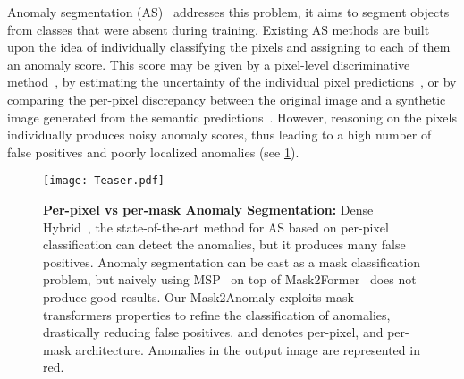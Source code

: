 \documentclass[10pt,twocolumn,letterpaper]{article}
\begin{document}
Anomaly segmentation (AS)~\cite{blum2019fishyscapes,xia2020synth,fontanel2021detecting,jung2021standardized} addresses this problem, \ie it aims to segment objects from classes that were absent during training. Existing AS methods are built upon the idea of individually classifying the pixels and assigning to each of them an anomaly score. This score may be given by a pixel-level discriminative method~\cite{angus2019oodsem, jung2021standardized, grcic2022densehybrid, tian2022pixel}, by estimating the uncertainty of the individual pixel predictions~\cite{mukhoti2018evaluating}, or by comparing the per-pixel discrepancy between the original image and a synthetic image generated from the semantic predictions~\cite{lis2019detecting, vojir2021road, xia2020synthesize}.
However, reasoning on the pixels individually produces noisy anomaly scores, thus leading to a high number of false positives and poorly localized anomalies (see \cref{fig:teaser}).


\begin{figure}[t]
    \begin{center}
        \texttt{[image: Teaser.pdf]}
    \end{center}
    \vspace{-1em}
      \caption{\textbf{Per-pixel vs per-mask Anomaly Segmentation:} Dense Hybrid~\cite{grcic2022densehybrid}, the state-of-the-art method for AS based on per-pixel classification can detect the anomalies, but it produces many false positives. Anomaly segmentation can be cast as a mask classification problem, but naively using MSP~\cite{hendrycks2016baseline} on top of Mask2Former~\cite{cheng2022masked} does not produce good results. Our Mask2Anomaly exploits mask-transformers properties to refine the classification of anomalies, drastically reducing false positives.  and  denotes per-pixel, and per-mask architecture. Anomalies in the output image are represented in {red}.}
    \label{fig:teaser} \end{figure}
\end{document}
